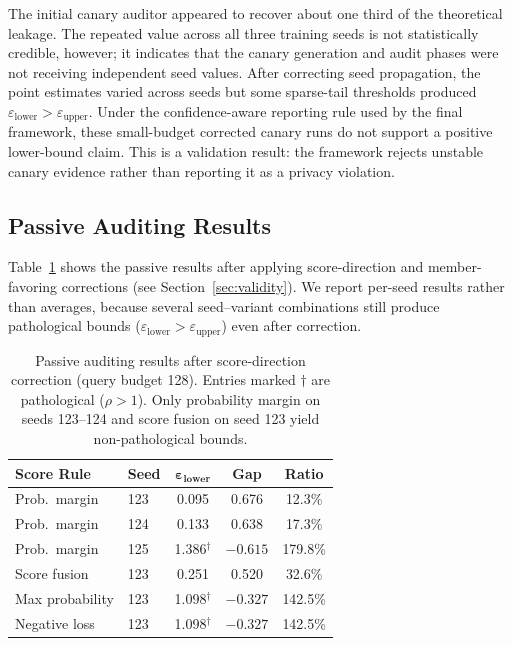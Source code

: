 \documentclass{article}
\begin{document}
The initial canary auditor appeared to recover about one third of the theoretical leakage. The repeated value across all three training seeds is not statistically credible, however; it indicates that the canary generation and audit phases were not receiving independent seed values. After correcting seed propagation, the point estimates varied across seeds but some sparse-tail thresholds produced $\varepsilon_{\text{lower}} > \varepsilon_{\text{upper}}$. Under the confidence-aware reporting rule used by the final framework, these small-budget corrected canary runs do not support a positive lower-bound claim. This is a validation result: the framework rejects unstable canary evidence rather than reporting it as a privacy violation.

\subsection{Passive Auditing Results}

Table~\ref{tab:passive} shows the passive results after applying score-direction and member-favoring corrections (see Section~\ref{sec:validity}). We report per-seed results rather than averages, because several seed--variant combinations still produce pathological bounds ($\varepsilon_{\text{lower}} > \varepsilon_{\text{upper}}$) even after correction.

\begin{table}[h]
\caption{Passive auditing results after score-direction correction (query budget 128). Entries marked $\dagger$ are pathological ($\rho > 1$). Only probability margin on seeds 123--124 and score fusion on seed 123 yield non-pathological bounds.}
\label{tab:passive}
\centering
\begin{tabular}{@{}llccc@{}}
\toprule
\textbf{Score Rule} & \textbf{Seed} & $\boldsymbol{\varepsilon_{\text{lower}}}$ & \textbf{Gap} & \textbf{Ratio} \\
\midrule
Prob.\ margin & 123 & 0.095 & 0.676 & 12.3\% \\
Prob.\ margin & 124 & 0.133 & 0.638 & 17.3\% \\
Prob.\ margin & 125 & 1.386$^\dagger$ & $-0.615$ & 179.8\% \\
\midrule
Score fusion & 123 & 0.251 & 0.520 & 32.6\% \\
\midrule
Max probability & 123 & 1.098$^\dagger$ & $-0.327$ & 142.5\% \\
Negative loss & 123 & 1.098$^\dagger$ & $-0.327$ & 142.5\% \\
\bottomrule
\end{tabular}
\end{table}
\end{document}

